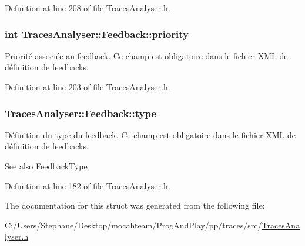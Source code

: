 Definition at line 208 of file Traces\+Analyser.\+h.

\subsubsection[{\texorpdfstring{priority}{priority}}]{\setlength{\rightskip}{0pt plus 5cm}int Traces\+Analyser\+::\+Feedback\+::priority}\hypertarget{struct_traces_analyser_1_1_feedback_ad139e027aaebcb9f3b4cfe4a5a7c5ff7}{}\label{struct_traces_analyser_1_1_feedback_ad139e027aaebcb9f3b4cfe4a5a7c5ff7}
Priorité associée au feedback. Ce champ est obligatoire dans le fichier X\+ML de définition de feedbacks. 

Definition at line 203 of file Traces\+Analyser.\+h.

\subsubsection[{\texorpdfstring{type}{type}}]{ Traces\+Analyser\+::\+Feedback\+::type}\hypertarget{struct_traces_analyser_1_1_feedback_a828dbdc4ca2e76874679e91a5245996e}{}\label{struct_traces_analyser_1_1_feedback_a828dbdc4ca2e76874679e91a5245996e}
Définition du type du feedback. Ce champ est obligatoire dans le fichier X\+ML de définition de feedbacks.

\begin{DoxySeeAlso}{See also}
\hyperlink{class_traces_analyser_a57be29ce5ac10ca51e56d8385b4a1820}{Feedback\+Type} 
\end{DoxySeeAlso}


Definition at line 182 of file Traces\+Analyser.\+h.



The documentation for this struct was generated from the following file\+:\begin{DoxyCompactItemize}
\item 
C\+:/\+Users/\+Stephane/\+Desktop/mocahteam/\+Prog\+And\+Play/pp/traces/src/\hyperlink{_traces_analyser_8h}{Traces\+Analyser.\+h}\end{DoxyCompactItemize}
